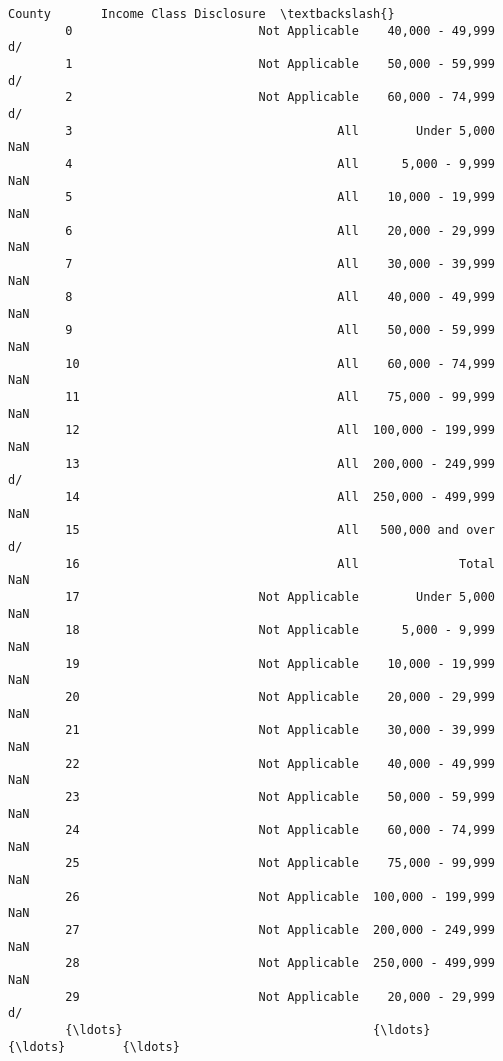 \documentclass[11pt]{article}
\begin{document}
\begin{Verbatim}[commandchars=\\\{\}]
                                           County       Income Class Disclosure  \textbackslash{}
        0                          Not Applicable    40,000 - 49,999         d/   
        1                          Not Applicable    50,000 - 59,999         d/   
        2                          Not Applicable    60,000 - 74,999         d/   
        3                                     All        Under 5,000        NaN   
        4                                     All      5,000 - 9,999        NaN   
        5                                     All    10,000 - 19,999        NaN   
        6                                     All    20,000 - 29,999        NaN   
        7                                     All    30,000 - 39,999        NaN   
        8                                     All    40,000 - 49,999        NaN   
        9                                     All    50,000 - 59,999        NaN   
        10                                    All    60,000 - 74,999        NaN   
        11                                    All    75,000 - 99,999        NaN   
        12                                    All  100,000 - 199,999        NaN   
        13                                    All  200,000 - 249,999         d/   
        14                                    All  250,000 - 499,999        NaN   
        15                                    All   500,000 and over         d/   
        16                                    All              Total        NaN   
        17                         Not Applicable        Under 5,000        NaN   
        18                         Not Applicable      5,000 - 9,999        NaN   
        19                         Not Applicable    10,000 - 19,999        NaN   
        20                         Not Applicable    20,000 - 29,999        NaN   
        21                         Not Applicable    30,000 - 39,999        NaN   
        22                         Not Applicable    40,000 - 49,999        NaN   
        23                         Not Applicable    50,000 - 59,999        NaN   
        24                         Not Applicable    60,000 - 74,999        NaN   
        25                         Not Applicable    75,000 - 99,999        NaN   
        26                         Not Applicable  100,000 - 199,999        NaN   
        27                         Not Applicable  200,000 - 249,999        NaN   
        28                         Not Applicable  250,000 - 499,999        NaN   
        29                         Not Applicable    20,000 - 29,999         d/   
        {\ldots}                                   {\ldots}                {\ldots}        {\ldots}   

\end{Verbatim}
\end{document}
